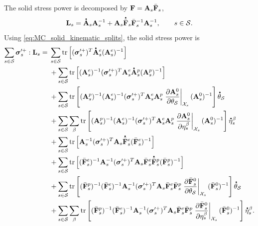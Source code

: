 The solid stress power is decomposed by
\(\mathbf{F}=\mathbf{A}_s\bar{\mathbf{F}}_s\),
%
\begin{equation}
	\mbf L_s
	=
	\phasedot{\mbf A}_s\mbf A_s^{-1}
	+
	\mbf A_s
	\phasedot{\bar{\mbf F}}_s
	\bar{\mbf F}_s^{-1}
	\mbf A_s^{-1},
	\qquad
	s\in\mc S .
	\label{eq:MC_F_split_for_power}
\end{equation}
%
Using \eqref{eq:MC_solid_kinematic_splits}, the solid stress power is
%
\begin{align}
	\sum_{s\in\mc S}\bs\sigma_s^{\prime+}:\mbf L_s
	={} &
	\sum_{s\in\mc S}
	\operatorname{tr}\left[
		(\bs\sigma_s^{\prime+})^T
		\phasedot{\mbf A}_s^e
		(\mbf A_s^e)^{-1}
		\right]
	\notag  \\
	    & +
	\sum_{s\in\mc S}
	\operatorname{tr}\left[
		(\mbf A_s^e)^{-1}
		(\bs\sigma_s^{\prime+})^T
		\mbf A_s^e
		\phasedot{\mbf A}_s^p
		(\mbf A_s^p)^{-1}
		\right]
	\notag  \\
	    & +
	\sum_{s\in\mc S}
	\operatorname{tr}\left[
		(\mbf A_s^p)^{-1}
		(\mbf A_s^e)^{-1}
		(\bs\sigma_s^{\prime+})^T
		\mbf A_s^e\mbf A_s^p
		\left.
		\p{\mbf A_s^0}{\theta_{\mc S}}
		\right\vert_{\mc X_s}
		(\mbf A_s^0)^{-1}
		\right]\phasedot\theta_{\mc S}
	\notag  \\
	    & +
	\sum_{s\in\mc S}
	\sum_\beta
	\operatorname{tr}\left[
		(\mbf A_s^p)^{-1}
		(\mbf A_s^e)^{-1}
		(\bs\sigma_s^{\prime+})^T
		\mbf A_s^e\mbf A_s^p
		\left.
		\p{\mbf A_s^0}{\eta_s^\beta}
		\right\vert_{\mc X_s}
		(\mbf A_s^0)^{-1}
		\right]\phasedot\eta_s^\beta
	\notag  \\
	    & +
	\sum_{s\in\mc S}
	\operatorname{tr}\left[
	\mbf A_s^{-1}
	(\bs\sigma_s^{\prime+})^T
	\mbf A_s
	\phasedot{\bar{\mbf F}}_s^e
	(\bar{\mbf F}_s^e)^{-1}
	\right]
	\notag  \\
	    & +
	\sum_{s\in\mc S}
	\operatorname{tr}\left[
	(\bar{\mbf F}_s^e)^{-1}
	\mbf A_s^{-1}
	(\bs\sigma_s^{\prime+})^T
	\mbf A_s
	\bar{\mbf F}_s^e
	\phasedot{\bar{\mbf F}}_s^p
	(\bar{\mbf F}_s^p)^{-1}
	\right]
	\notag  \\
	    & +
	\sum_{s\in\mc S}
	\operatorname{tr}\left[
	(\bar{\mbf F}_s^p)^{-1}
	(\bar{\mbf F}_s^e)^{-1}
	\mbf A_s^{-1}
	(\bs\sigma_s^{\prime+})^T
	\mbf A_s
	\bar{\mbf F}_s^e
	\bar{\mbf F}_s^p
	\left.
	\p{\bar{\mbf F}_s^0}{\theta_{\mc S}}
	\right\vert_{\mc X_s}
	(\bar{\mbf F}_s^0)^{-1}
	\right]\phasedot\theta_{\mc S}
	\notag  \\
	    & +
	\sum_{s\in\mc S}
	\sum_\beta
	\operatorname{tr}\left[
	(\bar{\mbf F}_s^p)^{-1}
	(\bar{\mbf F}_s^e)^{-1}
	\mbf A_s^{-1}
	(\bs\sigma_s^{\prime+})^T
	\mbf A_s
	\bar{\mbf F}_s^e
	\bar{\mbf F}_s^p
	\left.
	\p{\bar{\mbf F}_s^0}{\eta_s^\beta}
	\right\vert_{\mc X_s}
	(\bar{\mbf F}_s^0)^{-1}
	\right]\phasedot\eta_s^\beta .
	\label{eq:MC_stress_power_split}
\end{align}
%

